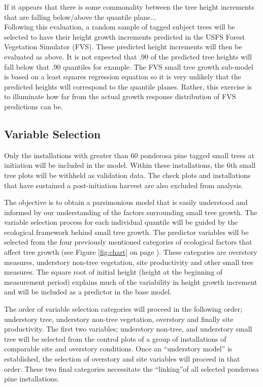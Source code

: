 \documentclass[11pt, letterpaper, fleqn]{article}
\begin{document}
	If it appears that there is some commonality between the tree height increments that are falling below/above the quantile plane...\\[2pt]

Following this evaluation, a random sample of tagged subject trees will be selected to have their height growth increments predicted in the USFS Forest Vegetation Simulator (FVS).  These predicted height increments will then be evaluated as above.  It is not expected that .90 of the predicted tree heights will fall below that .90 quantiles for example. The FVS small tree growth sub-model is based on a least squares regression equation so it is very unlikely that the predicted heights will correspond to the quantile planes.   Rather, this exercise is to illuminate how far from the actual growth response distribution of FVS predictions can be.\\[2pt]

\newpage
\subsection{Variable Selection}


\par Only the installations with greater than 60 ponderosa pine tagged small trees at initiation will be included in the model.  Within these installations, the 6th small tree plots will be withheld as validation data. The check plots and installations that have sustained a post-initiation harvest are also excluded from analysis.  

The objective is to obtain a parsimonious model that is easily understood and informed by our understanding of the factors surrounding small tree growth. The variable selection process for each individual quantile will be guided by the ecological framework behind small tree growth.  The predictor variables will be selected from the four previously mentioned categories of ecological factors that affect tree growth (see Figure \ref{fig:chart} on page \pageref{fig:chart}). These categories are overstory measures, understory non-tree vegetation, site productivity and other small tree measures.  The square root of initial height (height at the beginning of measurement period) explains much of the variability in height growth increment and will be included as a predictor in the base model.


The order of variable selection categories will proceed in the following order; understory tree, understory non-tree vegetation, overstory and finally site productivity. The first two variables; understory non-tree, and understory small tree will be selected from the control plots of a group of installations of comparable site and overstory conditions. Once an ``understory model'' is established, the selection of overstory and site variables will proceed in that order.  These two final categories necessitate the ``linking''of all selected ponderosa pine installations. 
\end{document}
